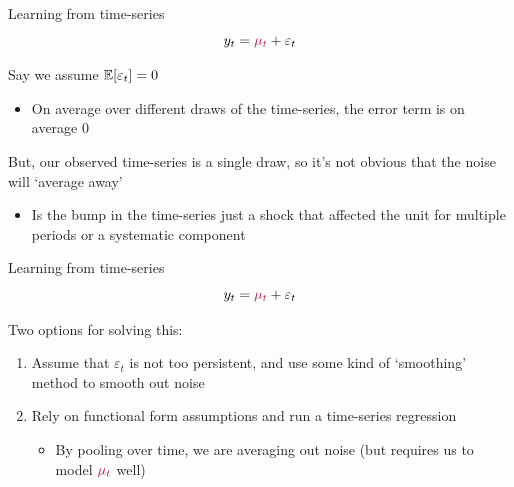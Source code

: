 \documentclass[aspectratio=169,t,11pt,table]{beamer}
\begin{document}
\begin{frame}{Learning from time-series}
  \vspace*{-\bigskipamount}
  $$
    y_t = {\color[HTML]{B3114B} \mu_t} + \varepsilon_t
  $$

  Say we assume $\expec{\varepsilon_t} = 0$
  \begin{itemize}
    \item On average over different draws of the time-series, the error term is on average 0
  \end{itemize}

  \bigskip
  But, our observed time-series is a single draw, so it's not obvious that the noise will `average away'
  \begin{itemize}
    \item Is the bump in the time-series just a shock that affected the unit for multiple periods or a systematic component
  \end{itemize}
\end{frame}

\begin{frame}{Learning from time-series}
  \vspace*{-\bigskipamount}
  $$
    y_t = {\color[HTML]{B3114B} \mu_t} + \varepsilon_t
  $$

  \bigskip
  Two options for solving this:
  \begin{enumerate}
    \item Assume that $\varepsilon_t$ is not too persistent, and use some kind of `smoothing' method to smooth out noise
    
    \item Rely on functional form assumptions and run a time-series regression 
    \begin{itemize}
      \item By pooling over time, we are averaging out noise (but requires us to model ${\color[HTML]{B3114B} \mu_t}$ well)
    \end{itemize}
  \end{enumerate}
\end{frame}

\end{document}
